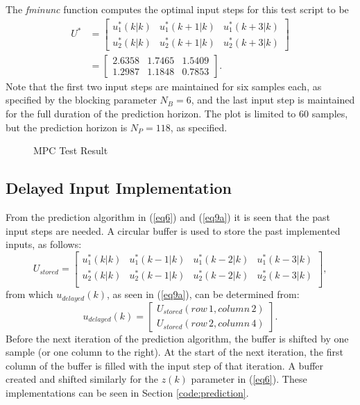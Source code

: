 \documentclass[12pt]{article}
\begin{document}
The \textit{fminunc} function computes the optimal input steps for this test script to be
\begin{align}
U^* &= \begin{bmatrix}
u^*_1(k|k) & u^*_1(k+1|k) & u^*_1(k+3|k) \\
u^*_2(k|k) & u^*_2(k+1|k) & u^*_2(k+3|k)
\end{bmatrix} \label{eq12}\\
&= \begin{bmatrix}
2.6358 & 1.7465 & 1.5409 \\
1.2987 & 1.1848 & 0.7853
\end{bmatrix}. \nonumber
\end{align}
Note that the first two input steps are maintained for six samples each, as specified by the blocking parameter $N_B=6$, and the last input step is maintained for the full duration of the prediction horizon. The plot is limited to 60 samples, but the prediction horizon is $N_P=118$, as specified.

\begin{figure}[h!]
	
	\centering
	\caption{MPC Test Result}
	\label{fig:TestMPC}
\end{figure}

\subsection{Delayed Input Implementation}

From the prediction algorithm in (\ref{eq6}) and (\ref{eq9a}) it is seen that the past input steps are needed. A circular buffer is used to store the past implemented inputs, as follows:
\begin{equation}
U_{stored} = \begin{bmatrix}
u^*_1(k|k) & u^*_1(k-1|k) & u^*_1(k-2|k) & u^*_1(k-3|k) \\
u^*_2(k|k) & u^*_2(k-1|k) & u^*_2(k-2|k) & u^*_2(k-3|k) \\
\end{bmatrix}, \label{eq13}
\end{equation}
from which $u_{delayed}(k)$, as seen in (\ref{eq9a}), can be determined from:
\begin{equation}
u_{delayed}(k) =
\begin{bmatrix}
U_{stored}(row \, 1, column \, 2) \\
U_{stored}(row \, 2, column \, 4)
\end{bmatrix}. \label{eq14}
\end{equation}
Before the next iteration of the prediction algorithm, the buffer is shifted by one sample (or one column to the right). At the start of the next iteration, the first column of the buffer is filled with the input step of that iteration. A buffer created and shifted similarly for the $z(k)$ parameter in (\ref{eq6}). These implementations can be seen in Section \ref{code:prediction}.
\end{document}
